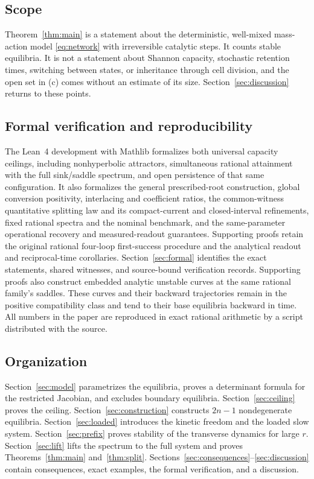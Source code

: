 \documentclass[11pt]{article}
\theoremstyle{plain}
\theoremstyle{definition}
\theoremstyle{remark}
\numberwithin{equation}{section}
\begin{document}
\subsection{Scope}
Theorem~\ref{thm:main} is a statement about the deterministic, well-mixed mass-action model
\eqref{eq:network} with irreversible catalytic steps. It counts stable equilibria. It is not a
statement about Shannon capacity, stochastic retention times, switching between states, or
inheritance through cell division, and the open set in (c) comes without an estimate of its
size. Section~\ref{sec:discussion} returns to these points.

\subsection{Formal verification and reproducibility}
The Lean~4 \cite{Lean4} development with Mathlib \cite{Mathlib} formalizes both universal
capacity ceilings, including nonhyperbolic attractors, simultaneous rational attainment with
the full sink/saddle spectrum, and open persistence of that same configuration. It also
formalizes the general prescribed-root construction, global conversion positivity,
interlacing and coefficient ratios, the common-witness quantitative splitting law and its
compact-current and closed-interval refinements, fixed rational spectra and the nominal
benchmark, and the same-parameter operational recovery and measured-readout guarantees.
Supporting proofs retain the original rational four-loop first-success procedure and the
analytical readout and reciprocal-time corollaries. Section~\ref{sec:formal} identifies the
exact statements, shared witnesses, and source-bound verification records. Supporting
proofs also construct embedded analytic unstable curves at the same rational family's
saddles. These curves and their backward trajectories remain in the positive compatibility
class and tend to their base equilibria backward in time. All numbers in the paper are
reproduced in exact rational arithmetic
by a script distributed with the source.

\subsection{Organization}
Section~\ref{sec:model} parametrizes the equilibria, proves a determinant formula for the
restricted Jacobian, and excludes boundary equilibria. Section~\ref{sec:ceiling} proves the
ceiling. Section~\ref{sec:construction} constructs \(2n-1\) nondegenerate equilibria.
Section~\ref{sec:loaded} introduces the kinetic freedom and the loaded slow system.
Section~\ref{sec:prefix} proves stability of the transverse dynamics for large \(r\).
Section~\ref{sec:lift} lifts the spectrum to the full system and proves
Theorems~\ref{thm:main} and~\ref{thm:split}. Sections~\ref{sec:consequences}--\ref{sec:discussion}
contain consequences, exact examples, the formal verification, and a discussion.







\end{document}
